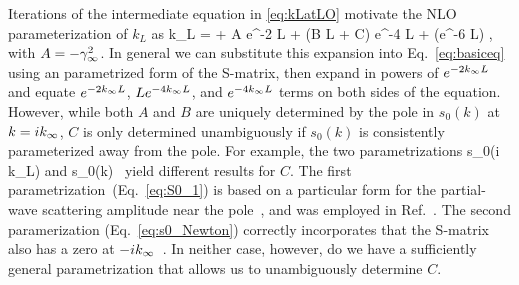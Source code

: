 	Iterations of the intermediate equation  in \eqref{eq:kLatLO} motivate the
	NLO parameterization of $k_L$ as
	\beq
	  k_L = \kinf + A e^{-2 \kinf L} + (B L + C) e^{-4 \kinf L}  +
		(e^{-6 \kinf L})
	  \;,
	  \label{eq:kLexpansion}
	\eeq
	with $A = -\gamma_\infty^2$.  In general we can substitute this expansion into
	Eq.~\eqref{eq:basiceq} using an parametrized form of the S-matrix,
	then expand in powers of $e^{-2 k_{\infty} L}$ and equate $e^{-2 k_{\infty} L}$,
	$L e^{-4 k_{\infty} L}$, and $e^{-4 k_{\infty} L}$ terms on both sides of the
	equation.  However, while both $A$ and $B$ are uniquely determined by
	the pole in $s_0(k)$ at $k=ik_{\infty}$, $C$ is only determined unambiguously if
	$s_0(k)$ is consistently parameterized away from the pole.  For
	example, the two parametrizations
	\beq
	\label{eq:S0_1}
	    s_0(i k_L) \approx {}
	\eeq
	and
	\beq
	  s_0(k) \approx {}\,
	  \label{eq:s0_Newton}
	\eeq
	yield different results for $C$. The first
	parametrization~(Eq.~\eqref{eq:S0_1}) is based on a particular form for the
	partial-wave scattering amplitude near the
	pole~\cite{taylor2006scattering}, and was employed in
	Ref.~\cite{More:2013rma}.  The second paramerization
	(Eq.~\eqref{eq:s0_Newton}) correctly incorporates that the S-matrix also has
	a zero at $-ik_{\infty}$~\cite{newton2002scattering}.  In neither case,
	however, do we have a sufficiently general parametrization that allows
	us to unambiguously determine $C$.

